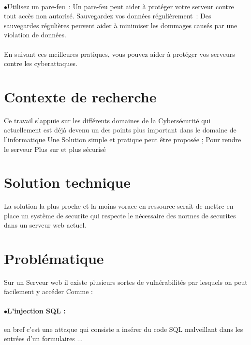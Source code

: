  \paragraph{ } $\bullet$Utilisez un pare-feu :  Un pare-feu peut aider à protéger votre serveur contre tout accès non autorisé.
 Sauvegardez vos données régulièrement :  Des sauvegardes régulières peuvent aider à minimiser les dommages causés par une violation de données.
\paragraph{ }
  \begin{Large}
  	En suivant ces meilleures pratiques, vous pouvez aider à protéger vos serveurs contre les cyberattaques.
  \end{Large}
  
   
   \section{Contexte de recherche }
   \paragraph{ } Ce travail s'appuie sur les différents domaines   de la  Cybersécurité qui actuellement est déjà devenu un  des points  plus   important dans le domaine de l'informatique 
   Une Solution simple et pratique peut être proposée  \space;
   Pour rendre le serveur Plus sur et plus sécurisé
   \section{Solution technique} 
   \paragraph{ }
   La solution la plus proche et la moins vorace en ressource serait de mettre en place un système de securite qui respecte le nécessaire des normes de securites dans un serveur web actuel.
   \section{Problématique }
   \paragraph{ }
   Sur un Serveur web il existe plusieurs sortes de vulnérabilités par lesquels on peut facilement y accéder Comme : 
     \paragraph {$\bullet$L'injection SQL : }
      en bref c'est une attaque qui consiste a insérer du code SQL malveillant  dans les entrées   d'un formulaires ...
   
